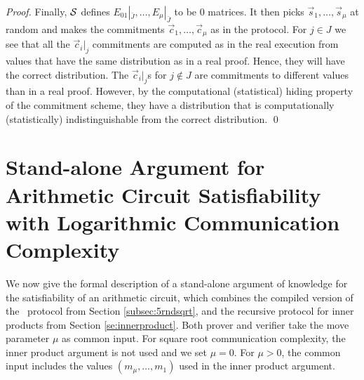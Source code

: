 \begin{proof}
Finally, $\mathcal{S}$ defines $E_{01}|_{\bar{J}},\ldots,E_{\mu}|_{\bar{J}}$ to be $0$ matrices. It then picks $\vec{s}_1,\ldots,\vec{s}_\mu$ at random and makes the commitments $\vec{c}_1,\ldots,\vec{c}_\mu$ as in the protocol. For $j\in J$ we see that all the $\vec{c}_i|_j$ commitments are computed as in the real execution from values that have the same distribution as in a real proof. Hence, they will have the correct distribution. The $\vec{c}_i|_j$s for $j\notin J$ are commitments to different values than in a real proof. However, by the computational (statistical) hiding property of the commitment scheme, they have a distribution that is computationally (statistically) indistinguishable from the correct distribution. \qed
\end{proof}

\chapter{Stand-alone Argument for Arithmetic Circuit Satisfiability with Logarithmic Communication Complexity}
\label{appendix:logprot}

We now give the formal description of a stand-alone argument of knowledge for the satisfiability of an arithmetic circuit, which combines the compiled version of the \ILC\ protocol from Section \ref{subsec:5rndsqrt}, and the recursive protocol for inner products from Section \ref{se:innerproduct}. Both prover and verifier take the move parameter $\mu$ as common input. For square root communication complexity, the inner product argument is not used and we set $\mu=0$. For $\mu > 0$, the common input includes the values $(m_\mu,\ldots,m_1)$ used in the inner product argument.

